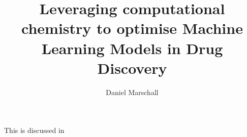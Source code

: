 \documentclass{article}
\begin{document}
\title{Leveraging computational chemistry to optimise Machine Learning Models in Drug Discovery}
\author{Daniel Marschall}
\maketitle

This is discussed in \cite{mayrLargescaleComparisonMachine2018}

\printbibliography
\end{document}
